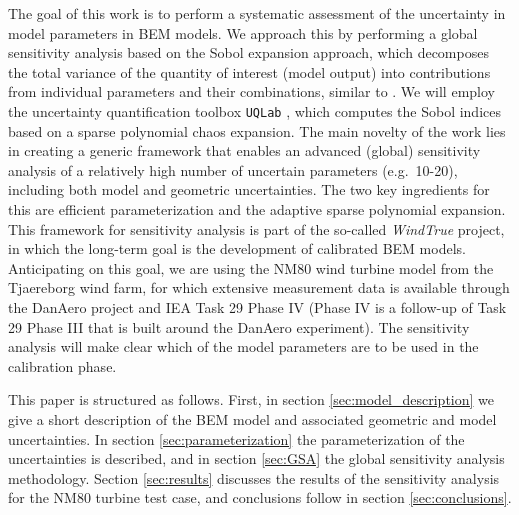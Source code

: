The goal of this work is to perform a systematic assessment of the uncertainty in model parameters in BEM models. We approach this by performing a global sensitivity analysis based on the Sobol expansion approach, which decomposes the total variance of the quantity of interest (model output) into contributions from individual parameters and their combinations, similar to \cite{Echeverria2017,Murcia2018, Rinker2016a}. We will employ the uncertainty quantification toolbox \texttt{UQLab} \cite{uqlab}, which computes the Sobol indices based on a sparse polynomial chaos expansion. The main novelty of the work lies in creating a generic framework that enables an advanced (global) sensitivity analysis of a relatively high number of uncertain parameters (e.g.\ 10-20), including both model and geometric uncertainties. The two key ingredients for this are efficient parameterization and the adaptive sparse polynomial expansion. This framework for sensitivity analysis is part of the so-called \textit{WindTrue} project, in which the long-term goal is the development of calibrated BEM models. Anticipating on this goal, we are using the NM80 wind turbine model from the Tjaereborg wind farm, for which extensive measurement data is available through the DanAero project \cite{Troldborg2013} and IEA Task 29  Phase IV (Phase IV is a follow-up of Task 29 Phase III \cite{Boorsma2018} that is built around the DanAero experiment). The sensitivity analysis will make clear which of the model parameters are to be used in the calibration phase.

This paper is structured as follows. First, in section \ref{sec:model_description} we give a short description of the BEM model and associated geometric and model uncertainties. In section \ref{sec:parameterization} the parameterization of the uncertainties is described, and in section \ref{sec:GSA} the global sensitivity analysis methodology. Section \ref{sec:results} discusses the results of the sensitivity analysis for the NM80 turbine test case, and conclusions follow in section \ref{sec:conclusions}.

